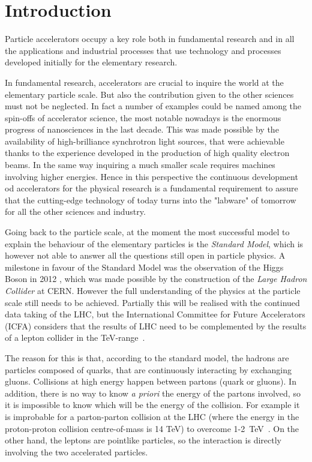 \chapter{Introduction}
Particle accelerators occupy a key role both in fundamental research and in all the applications and industrial processes that use technology and processes developed initially for the elementary research.

In fundamental research, accelerators are crucial to inquire the world at the elementary particle scale. But also the contribution given to the other sciences must not be neglected.
In fact a number of examples could be named among the spin-offs of accelerator science, the most notable nowadays is the enormous progress of nanosciences in the last decade. This was made possible by the availability of high-brilliance synchrotron light sources, that were achievable thanks to the experience developed in the production of high quality electron beams. In the same way inquiring a much smaller scale requires machines involving higher energies.
 Hence in this perspective the continuous development od  accelerators for the physical research is a fundamental requirement to assure that the cutting-edge technology of today turns into the "labware" of tomorrow for all the other sciences and industry.

Going back to the particle scale, at the moment the most successful model to explain the behaviour of the elementary particles is the \textit{Standard Model}, which is however not able to answer all the questions still open in particle physics. A milestone in favour of the Standard Model was the observation of the Higgs Boson in 2012 \cite{CMS:higgs,ATLAS:higgs}, which was made possible by the construction of the \textit{Large Hadron Collider} at CERN\cite{LHC:design}. However the full understanding of the physics at the particle scale still needs to be achieved. Partially this will be realised with the continued data taking of the LHC, but the International Committee for Future Accelerators (ICFA) considers that the results of LHC need to be complemented by the results of a lepton collider in the TeV-range~\cite{ICFA:linStat}.

The reason for this is that, according to the standard model, the hadrons are particles composed of quarks, that are continuously interacting by exchanging gluons. Collisions at high energy happen between partons (quark or gluons). In addition, there is no  way to know \textit{a priori} the energy of the partons involved, so it is impossible to know which will be the energy of the collision. For example it is improbable for a parton-parton collision at the LHC (where the energy in the proton-proton collision centre-of-mass  is 14 TeV) to overcome 1-2~TeV~\cite{LHC:partonDistrib}. On the other hand, the leptons are pointlike particles, so the interaction is directly involving the two accelerated particles.

